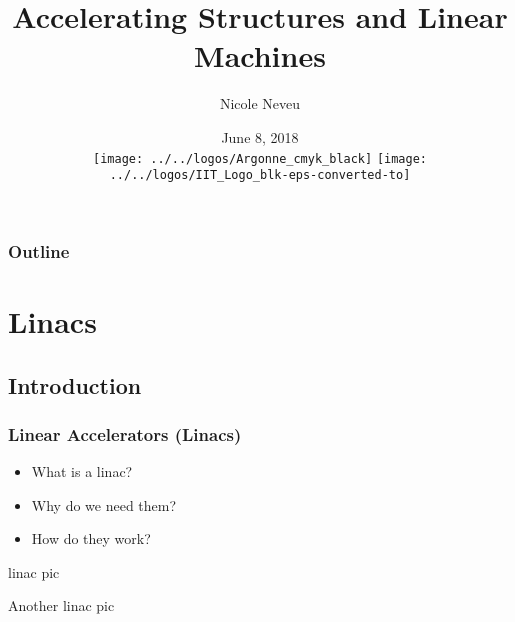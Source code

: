 \documentclass[professionalfonts,t]{beamer}
\title[USPAS 2018]{Accelerating Structures and Linear Machines}
\author[N.Neveu]{{\Large Nicole Neveu}}
\institute[ANL, IIT] %
{   Illinois Institute of Technology \\
	Argonne National Laboratory \\
    \url{nneveu@anl.gov} 
}
\date{ June 8, 2018 \\ \vspace{0.5em}
\texttt{[image: ../../logos/Argonne\_cmyk\_black]}%
\hfill \hfill \hfill%
\texttt{[image: ../../logos/IIT\_Logo\_blk-eps-converted-to]}%
}
\begin{document}
\begin{frame}
  \titlepage
\end{frame}
\begin{frame}
	\frametitle{Outline}
	\tableofcontents
\end{frame}







\section{Linacs}
\subsection{Introduction}

\begin{frame}
	\frametitle{Linear Accelerators (Linacs)}
	\vspace{1em}
	
	\begin{minipage}{0.5\textwidth}
		\begin{itemize}
			\item What is a linac?
			\item Why do we need them?
			\item How do they work?
		\end{itemize}
	\end{minipage}
\begin{minipage}{0.45\textwidth}
	linac pic
\end{minipage}

\vspace{1em}
Another linac pic
	
	

\end{frame}
\end{document}
